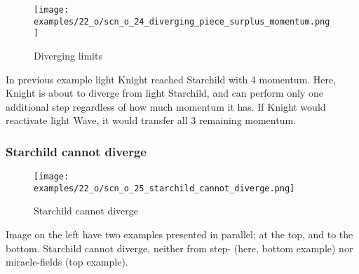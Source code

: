 
\vspace*{0.4\baselineskip}
\noindent
\begin{wrapfigure}[9]{l}{0.4\textwidth}
\centering
\texttt{[image: examples/22\_o/scn\_o\_24\_diverging\_piece\_surplus\_momentum.png]}
\vspace*{-0.4\baselineskip}
\caption{Diverging limits}
\label{fig:scn_o_24_diverging_piece_surplus_momentum}
\end{wrapfigure}
In previous example light Knight reached Starchild with 4 momentum. Here, Knight
is about to diverge from light Starchild, and can perform only one additional step
regardless of how much momentum it has. If Knight would reactivate light Wave, it
would transfer all 3 remaining momentum.


\vspace*{-0.9\baselineskip}
\subsubsection*{Starchild cannot diverge}
\label{sec:One/Starchild/Divergence/Starchild cannot diverge}

\vspace*{-0.9\baselineskip}
\noindent
\begin{wrapfigure}[7]{l}{0.4\textwidth}
\centering
\texttt{[image: examples/22\_o/scn\_o\_25\_starchild\_cannot\_diverge.png]}
\vspace*{-0.4\baselineskip}
\caption{Starchild cannot diverge}
\label{fig:scn_o_25_starchild_cannot_diverge}
\end{wrapfigure}
Image on the left have two examples presented in parallel; at the top, and to the
bottom. \newline
\indent
Starchild cannot diverge, neither from step- (here, bottom example) nor miracle-fields
(top example).

\clearpage %


